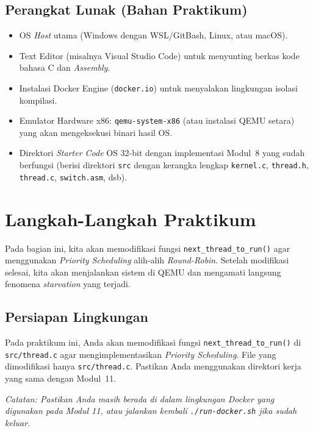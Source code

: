 \subsection{Perangkat Lunak (Bahan Praktikum)}
\begin{itemize}
	\item OS \textit{Host} utama (Windows dengan WSL/GitBash, Linux, atau macOS).
	\item Text Editor (misalnya Visual Studio Code) untuk menyunting berkas kode bahasa C dan \textit{Assembly}.
	\item Instalasi Docker Engine (\texttt{docker.io}) untuk menyalakan lingkungan isolasi kompilasi.
	\item Emulator Hardware x86: \texttt{qemu-system-x86} (atau instalasi QEMU setara) yang akan mengeksekusi binari hasil OS.
	\item Direktori \textit{Starter Code} OS 32-bit dengan implementasi Modul~8 yang sudah berfungsi (berisi direktori \texttt{src} dengan kerangka lengkap \texttt{kernel.c}, \texttt{thread.h}, \texttt{thread.c}, \texttt{switch.asm}, dsb).
\end{itemize}

\newpage
\section{Langkah-Langkah Praktikum}

Pada bagian ini, kita akan memodifikasi fungsi \texttt{next\_thread\_to\_run()} agar menggunakan \textit{Priority Scheduling} alih-alih \textit{Round-Robin}. Setelah modifikasi selesai, kita akan menjalankan sistem di QEMU dan mengamati langsung fenomena \textit{starvation} yang terjadi.

\subsection{Persiapan Lingkungan}
\label{sec:m12-persiapan}

Pada praktikum ini, Anda akan memodifikasi fungsi \texttt{next\_thread\_to\_run()} di \texttt{src/thread.c} agar mengimplementasikan \textit{Priority Scheduling}. File yang dimodifikasi hanya \texttt{src/thread.c}. Pastikan Anda menggunakan direktori kerja yang sama dengan Modul~11.

\textit{Catatan: Pastikan Anda masih berada di dalam lingkungan Docker yang digunakan pada Modul 11, atau jalankan kembali \texttt{./run-docker.sh} jika sudah keluar.}

